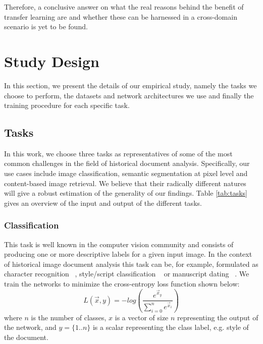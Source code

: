 \documentclass[journal]{IEEEtran}
\newcommand{\af}[1]{{\color{black}#1}}
\begin{document}
Therefore, a conclusive answer on what the real reasons behind the benefit of transfer learning are and whether these can be harnessed in a cross-domain scenario is yet to be found.


 
\section{Study Design}\label{toc:experimental_setting}

In this section, we present the details of our \af{empirical study}, namely the tasks we choose to perform, the datasets and network architectures we use and finally the training procedure for each specific task. 


\subsection{Tasks}
In this work, we choose three tasks as representatives of \af{some of} the most common challenges in the \af{field of historical document analysis}.
Specifically, our use cases include image classification, \af{semantic segmentation at pixel level and content-based image retrieval}.
We believe that their radically different natures will give a robust estimation of the generality of our findings.
Table \ref{tab:tasks} gives an overview of the input and output of the different tasks.

\subsubsection{Classification}

This task is well known in the computer vision community and consists of producing one or more descriptive labels for a given input image.
In the context of historical image document analysis this task can be, for example, formulated as character recognition ~\cite{clanuwat2018deep,vamvakas2008complete}, style/script classification ~\cite{al2011recognition,cloppet2017icdar2017} or \af{manuscript dating ~\cite{cloppet2017icdar2017,wahlberg2016historical}}.
We train the networks to minimize the cross-entropy loss function shown below:
\begin{equation}
L(\vec{x}, y) = - log \left( \frac{e^{\vec{x}_y}}{\sum_{i=0}^{n}e^{\vec{x}_i}} \right)
\end{equation}
where $n$ is the number of classes, $x$ is a vector of size $n$ representing the output of the network, and $y = \{1..n\}$ \af{is a scalar} representing the class label, e.g. style of the document.
\end{document}
